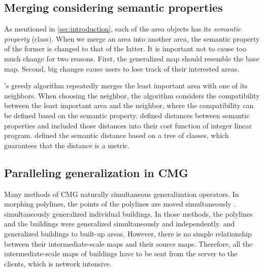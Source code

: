 \documentclass[twocolumn]{svjour3}          %
\begin{document}




\subsection{Merging considering semantic properties}

As mentioned in \sect\ref{sec:introduction}, 
each of the area objects has its \emph{semantic property} (\ie class).
When we merge an area into another area, 
the semantic property of the former is changed to that of the latter.
It is important not to cause too much change for two reasons.
First, the generalized map should resemble the base map.
Second, big changes cause users to lose track of their interested areas.

's greedy algorithm repeatedly merges 
the least important area with one of its neighbors.
When choosing the neighbor, the algorithm considers 
the compatibility between the least important area and the neighbor,
where the compatibility can be defined based on the semantic property.
\citet{HaunertWolff2010AreaAgg} defined distances between semantic properties 
and included those distances into their cost function of integer linear program.
\citet{Peng2020AreaAgg} defined the semantic distance based on a tree of classes,
which guarantees that the distance is a metric.   




\subsection{Paralleling generalization in CMG}


Many methods of CMG naturally simultaneous generalization operators.
In morphing polylines, the points of the polylines are moved simultaneously
\citep[\eg][]{Noellenburg2008,Li2017Annealing}.
\citet{Li2017_Building} simultaneously generalized individual buildings.
In those methods, the polylines and the buildings 
were generalized simultaneously and independently.
\citet{Peng2017Building} and \citet{Touya2017Progressive}
generalized buildings to built-up areas.
However, there is no simple relationship 
between their intermediate-scale maps and their source maps.
Therefore, all the intermediate-scale maps of buildings have to be
sent from the server to the clients,
which is network intensive.
\end{document}
